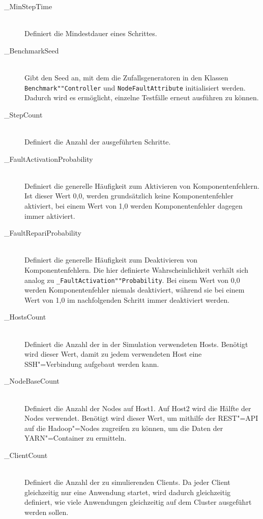 \begin{description}
    \item [\_MinStepTime] \hfill \\
        Definiert die Mindestdauer eines Schrittes.
        
    \item[\_BenchmarkSeed] \hfill \\
        Gibt den Seed an, mit dem die Zufallsgeneratoren in den Klassen \texttt{Benchmark""Controller} und \texttt{NodeFaultAttribute} initialisiert werden.
        Dadurch wird es ermöglicht, einzelne Testfälle erneut ausführen zu können.
        
    \item[\_StepCount] \hfill \\
        Definiert die Anzahl der ausgeführten Schritte.
        
    \item[\_FaultActivationProbability] \hfill \\
        Definiert die generelle Häufigkeit zum Aktivieren von Komponentenfehlern.
        Ist dieser Wert 0,0, werden grundsätzlich keine Komponentenfehler aktiviert, bei einem Wert von 1,0 werden Komponentenfehler dagegen immer aktiviert.
        
    \item[\_FaultRepariProbability] \hfill \\
        Definiert die generelle Häufigkeit zum Deaktivieren von Komponentenfehlern.
        Die hier definierte Wahrscheinlichkeit verhält sich analog zu \texttt{\_FaultActivation""Probability}.
        Bei einem Wert von 0,0 werden Komponentenfehler niemals deaktiviert, während sie bei einem Wert von 1,0 im nachfolgenden Schritt immer deaktiviert werden.
        
    \item[\_HostsCount] \hfill \\
        Definiert die Anzahl der in der Simulation verwendeten Hosts.
        Benötigt wird dieser Wert, damit zu jedem verwendeten Host eine SSH"=Verbindung aufgebaut werden kann.
        
    \item[\_NodeBaseCount] \hfill \\
        Definiert die Anzahl der Nodes auf Host1.
        Auf Host2 wird die Hälfte der Nodes verwendet.
        Benötigt wird dieser Wert, um mithilfe der REST"=API auf die Hadoop"=Nodes zugreifen zu können, um die Daten der YARN"=Container zu ermitteln.
        
    \item[\_ClientCount] \hfill \\
        Definiert die Anzahl der zu simulierenden Clients.
        Da jeder Client gleichzeitig nur eine Anwendung startet, wird dadurch gleichzeitig definiert, wie viele Anwendungen gleichzeitig auf dem Cluster ausgeführt werden sollen.
\end{description}

